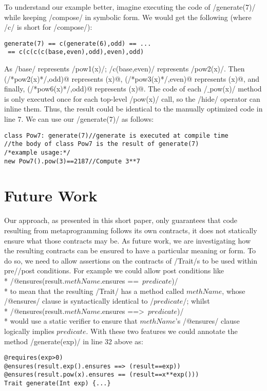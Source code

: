To understand our example better, imagine executing the code of /generate(7)/ while keeping /compose/ in symbolic form. We would get the following (where /c/ is short for /compose/):
\vspace{-1ex}
\begin{lstlisting}[numbers=none]
generate(7) == c(generate(6),odd) == ...
 == c(c(c(c(base,even),odd),even),odd)
\end{lstlisting}
\vspace{-1ex}
As /base/ represents /pow1(x)/; /c(base,even)/ represents /pow2(x)/. Then \Q@c(/*pow2(x)*/,odd)@ represents (x)@, \Q@c(/*pow3(x)*/,even)@ represents (x)@, and finally,
\Q@c(/*pow6(x)*/,odd)@ represents (x)@.
The code of each /$\_$pow(x)/ method is only executed once for each top-level /pow(x)/ call, so the /hide/ operator can inline them.
Thus, the result could be identical to the manually optimized code in line 7.
We can use our /generate(7)/ as follows:
\begin{lstlisting}
class Pow7: generate(7)//generate is executed at compile time
//the body of class Pow7 is the result of generate(7)
/*example usage:*/
new Pow7().pow(3)==2187//Compute 3**7
\end{lstlisting}

\section{Future Work}
Our approach, as presented in this short paper, only guarantees that code resulting from metaprogramming follows its own contracts, it does
not statically ensure what those contracts may be. As future work, we are investigating how the resulting contracts can be ensured to have a particular meaning or form.
To do so, we need to allow assertions on the contracts of /Trait/s to be used within pre//post conditions.
For example we could allow post conditions like\\*
/@ensures(result.$\mathit{methName}$.ensures ==\ $\mathit{predicate}$)/ \\*
to mean that the resulting /Trait/ has
a method
called $\mathit{methName}$, whose /@ensures/ clause is syntactically identical to  /$predicate$/; whilst
\\*
/@ensures(result.$\mathit{methName}$.ensures ==>\ $\mathit{predicate}$)/
\\*
would use a static verifier to ensure that $\mathit{methName}$'s /@ensures/ clause logically implies $\mathit{predicate}$.
With these two features we could annotate the method /generate(exp)/ in line 32 above as:
\begin{lstlisting}
@requires(exp>0)
@ensures(result.exp().ensures ==> (result==exp))
@ensures(result.pow(x).ensures == (result==x**exp()))
Trait generate(Int exp) {...}
\end{lstlisting}

